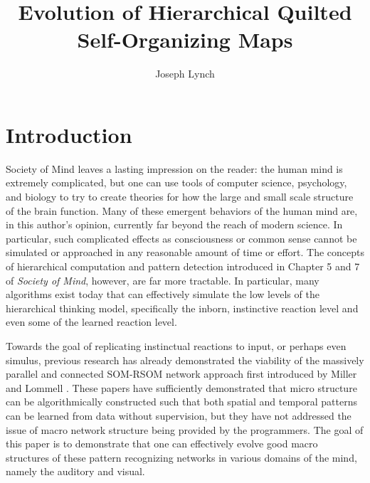 \documentclass[12pt,a4paper]{article}
\author{Joseph Lynch}
\title{Evolution of Hierarchical Quilted Self-Organizing Maps}
\begin{document}

\maketitle

\section{Introduction}
Society of Mind leaves a lasting impression on the reader: the human mind is extremely complicated, but one can use tools of computer science, psychology, and biology to try to create theories for how the large and small scale structure of the brain function.  Many of these emergent behaviors of the human mind are, in this author's opinion, currently far beyond the reach of modern science.  In particular, such complicated effects as consciousness or common sense cannot be simulated or approached in any reasonable amount of time or effort. The concepts of hierarchical computation and pattern detection introduced in Chapter 5 and 7 of \textit{Society of Mind}, however, are far more tractable.  In particular, many algorithms exist today that can effectively simulate the low levels of the hierarchical thinking model, specifically the inborn, instinctive reaction level and even some of the learned reaction level.

Towards the goal of replicating instinctual reactions to input, or perhaps even simulus, previous research has already demonstrated the viability of the massively parallel and connected SOM-RSOM network approach first introduced by Miller and Lommell \cite{MLPaper} \cite{HQSOM}.  These papers have sufficiently demonstrated that micro structure can be algorithmically constructed such that both spatial and temporal patterns can be learned from data without supervision, but they have not addressed the issue of macro network structure being provided by the programmers. The goal of this paper is to demonstrate that one can effectively evolve good macro structures of these pattern recognizing networks in various domains of the mind, namely the auditory and visual.
\end{document}
